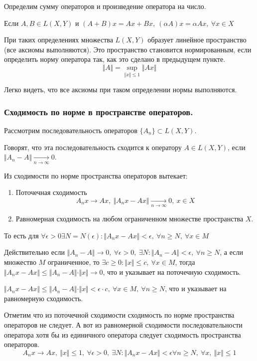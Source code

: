 \documentclass[14pt,a4paper]{extarticle}
\theoremstyle{definition}
\theoremstyle{remark}
\renewcommand{\[}{\begin{dmath*}[compact]}
\renewcommand{\]}{\end{dmath*}}
\newcommand{\be}{\begin{enumerate}}
\newcommand{\ee}{\end{enumerate}}
\newcommand{\sep}{ , \ \allowbreak }
\begin{document}
Определим сумму операторов и произведение оператора на число.

Если $A, B \in L(X,Y)$ и $(A+B)x = Ax + Bx \sep (\alpha A)x = \alpha Ax \sep
\forall x \in X$

При таких определениях множества $L(X,Y)$ образует линейное пространство
(все аксиомы выполняются). Это пространство становится нормированным, если
определить норму оператора так, как это сделано в предыдущем пункте.
\[\Vert A \Vert = \sup_{\Vert x \Vert \leq 1} \Vert Ax \Vert\]

Легко видеть, что все аксиомы при таком определении нормы выполняются.

\subsubsection{Сходимость по норме в пространстве операторов.}

Рассмотрим последовательность операторов $\{A_n\} \subset L(X,Y)$.

Говорят, что эта последовательность сходится к оператору $A \in L(X,Y)$, если
$\Vert A_n - A \Vert \underset{n \to \infty}{\to} 0$.

Из сходимости по норме пространства операторов вытекает:
\be
  \item Поточечная сходимость
  \[A_nx \to Ax \sep \Vert A_nx - Ax \Vert \underset{n \to \infty}{\to} 0 \sep
  x \in X\]

  \item Равномерная сходимость на любом ограниченном множестве пространства $X$.
\ee

То есть для $\forall \epsilon > 0 \exists N = N(\epsilon): \Vert A_nx-Ax \Vert
< \epsilon \sep \forall n \geq N \sep \forall x \in M$

Действительно если $\Vert A_n - A \Vert \to 0 \sep \forall \epsilon > 0 \sep
\exists N: \Vert A_n - A \Vert < \epsilon \sep \forall n \geq N$,
а если множество $M$ ограниченное, то $\exists c \geq 0: \Vert x \Vert \leq c
\sep \forall x \in M$, тогда $\Vert A_nx - Ax \Vert \leq \Vert A_n - A \Vert
\cdot \Vert x \Vert \to 0$, что и указывает на поточечную сходимость.

$\Vert A_nx - Ax \Vert \leq \Vert A_n-A \Vert \cdot \Vert x \Vert <
\epsilon \cdot c \sep \forall x \in M \sep \forall n \geq N$, что и указывает
на равномерную сходимость.

Отметим что из поточечной сходимости сходимость по норме пространства
операторов не следует. А вот из равномерной сходимости последовательности
оператора хотя бы из единичного оператора следует сходимость пространства
операторов.
\[A_nx \to Ax \sep \Vert x \Vert \leq 1 \sep \forall \epsilon > 0 \sep
\exists N : \Vert A_nx-Ax \Vert < \epsilon \forall n \geq N \sep
\forall x \sep \Vert x \Vert \leq 1\]
\end{document}
